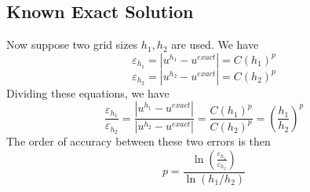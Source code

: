 \documentclass[11pt]{article}
\begin{document}
\subsection{Known Exact Solution}
Now suppose two grid sizes $h_1,h_2$ are used. We have
\begin{equation}
	\varepsilon_{h_1} = |u^{h_1} - u^{exact}| = C (h_1)^p
\end{equation}
\begin{equation}
	\varepsilon_{h_2} = |u^{h_2} - u^{exact}| = C (h_2)^p
\end{equation}
Dividing these equations, we have
\begin{equation}
	\frac{\varepsilon_{h_1}}{\varepsilon_{h_2}}
	=
	\frac{|u^{h_1} - u^{exact}|}{|u^{h_2} - u^{exact}|}
	=
	\frac{C (h_1)^p}{C (h_2)^p}
	=
	\left(\frac{h_1}{h_2}\right)^p
\end{equation}
The order of accuracy between these two errors is then
\begin{equation}
	\boxed{
	p = \frac{\ln(\frac{\varepsilon_{h_1}}{\varepsilon_{h_2}})}{\ln(h_1/h_2)}
	}
\end{equation}
\end{document}
